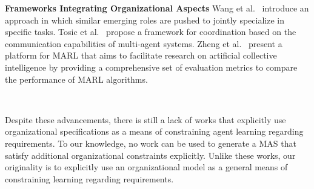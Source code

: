 \documentclass[runningheads]{llncs}
\theoremstyle{freethm}
\theoremstyle{proofoutline}
\begin{document}
\textbf{Frameworks Integrating Organizational Aspects} \quad
%
Wang et al.~\cite{Wang2020} introduce an approach in which similar emerging roles are pushed to jointly specialize in specific tasks. Tosic et al.~\cite{Tosic2010} propose a framework for coordination based on the communication capabilities of multi-agent systems. Zheng et al.~\cite{Zheng2018} present a platform for MARL that aims to facilitate research on artificial collective intelligence by providing a comprehensive set of evaluation metrics to compare the performance of MARL algorithms.

\

Despite these advancements, there is still a lack of works that explicitly use organizational specifications as a means of constraining agent learning regarding requirements. To our knowledge, no work can be used to generate a MAS that satisfy additional organizational constraints explicitly. Unlike these works, our originality is to explicitly use an organizational model as a general means of constraining learning regarding requirements.






\end{document}
